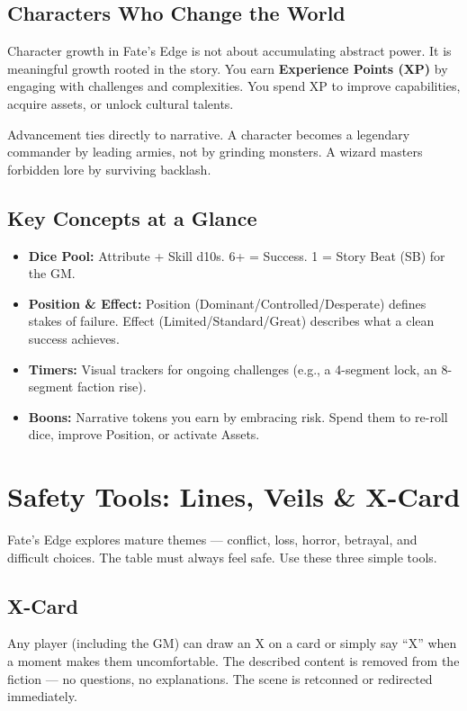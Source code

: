 \documentclass[11pt]{book}
\begin{document}
\subsection*{Characters Who Change the World}

Character growth in Fate's Edge is not about accumulating abstract power. It is meaningful growth rooted in the story. You earn \textbf{Experience Points (XP)} by engaging with challenges and complexities. You spend XP to improve capabilities, acquire assets, or unlock cultural talents.

Advancement ties directly to narrative. A character becomes a legendary commander by leading armies, not by grinding monsters. A wizard masters forbidden lore by surviving backlash.

\subsection*{Key Concepts at a Glance}

\begin{itemize}
  \item \textbf{Dice Pool:} Attribute + Skill d10s. 6+ = Success. 1 = Story Beat (SB) for the GM.
  \item \textbf{Position \& Effect:} Position (Dominant/Controlled/Desperate) defines stakes of failure. Effect (Limited/Standard/Great) describes what a clean success achieves.
  \item \textbf{Timers:} Visual trackers for ongoing challenges (e.g., a 4-segment lock, an 8-segment faction rise).
  \item \textbf{Boons:} Narrative tokens you earn by embracing risk. Spend them to re-roll dice, improve Position, or activate Assets.
\end{itemize}

\section{Safety Tools: Lines, Veils \& X-Card}

Fate's Edge explores mature themes --- conflict, loss, horror, betrayal, and difficult choices. The table must always feel safe. Use these three simple tools.

\subsection*{X-Card}
Any player (including the GM) can draw an X on a card or simply say ``X'' when a moment makes them uncomfortable. The described content is removed from the fiction --- no questions, no explanations. The scene is retconned or redirected immediately.
\end{document}
